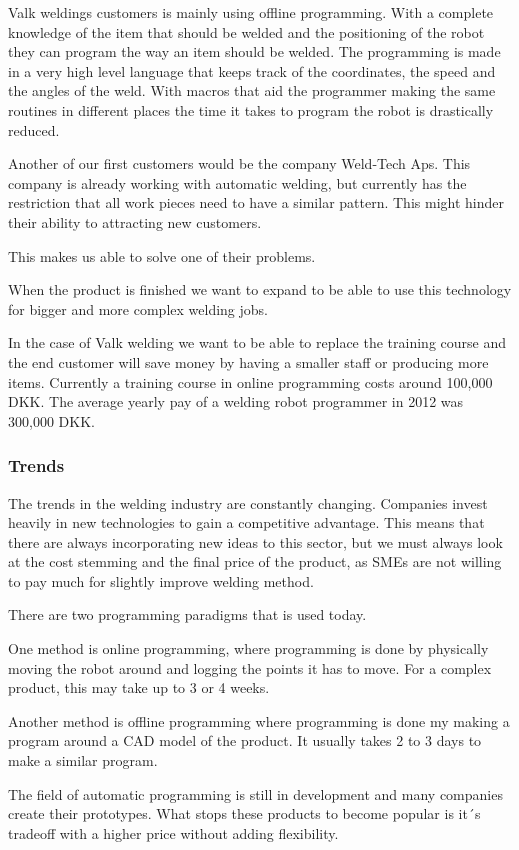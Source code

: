 Valk weldings customers is mainly using offline programming.
With a complete knowledge of the item that should be welded and the positioning of the robot they can program the way an item should be welded.
The programming is made in a very high level language that keeps track of the coordinates, the speed and the angles of the weld.
With macros that aid the programmer making the same routines in different places the time it takes to program the robot is drastically reduced.

Another of our first customers would be the company Weld-Tech Aps. 
This company is already working with automatic welding, but currently has the restriction that all work pieces need to have a similar pattern. 
This might hinder their ability to attracting new customers.

This makes us able to solve one of their problems. 

When the product is finished we want to expand to be able to use this technology for bigger and more complex welding jobs.

In the case of Valk welding we want to be able to replace the training course and the end customer will save money by having a smaller staff or producing more items. 
Currently a training course in online programming costs around 100,000 DKK. 
The average yearly pay of a welding robot programmer in 2012 was 300,000 DKK. 

\subsubsection{Trends}
The trends in the welding industry are constantly changing. 
Companies invest heavily in new technologies to gain a competitive advantage. 
This means that there are always incorporating new ideas to this sector, but we must always look at the cost stemming and the final price of the product, as SMEs are not willing to pay much for slightly improve welding method.

There are two programming paradigms that is used today.

One method is online programming, where programming is done by physically moving the robot around and logging the points it has to move. For a complex product, this may take up to 3 or 4 weeks.

Another method is offline programming where programming is done my making a program around a CAD model of the product.
It usually takes 2 to 3 days to make a similar program.

The field of automatic programming is still in development and many companies create their prototypes. 
What stops these products to become popular is it´s tradeoff with a higher price without adding flexibility.